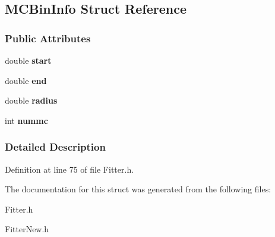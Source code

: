 \hypertarget{structMCBinInfo}{
\subsection{MCBinInfo Struct Reference}
\label{structMCBinInfo}
}
\subsubsection*{Public Attributes}
\begin{DoxyCompactItemize}
\item 
\hypertarget{structMCBinInfo_a977c6f52ec69f4842527706115ce91bf}{
double {\bfseries start}}
\label{structMCBinInfo_a977c6f52ec69f4842527706115ce91bf}

\item 
\hypertarget{structMCBinInfo_a964eaa282a44156c957e26eea27c8374}{
double {\bfseries end}}
\label{structMCBinInfo_a964eaa282a44156c957e26eea27c8374}

\item 
\hypertarget{structMCBinInfo_aaea60de9155baf52311a4664d5bd530b}{
double {\bfseries radius}}
\label{structMCBinInfo_aaea60de9155baf52311a4664d5bd530b}

\item 
\hypertarget{structMCBinInfo_a541d4c5a4903e5246343e07ac4bcb04c}{
int {\bfseries nummc}}
\label{structMCBinInfo_a541d4c5a4903e5246343e07ac4bcb04c}

\end{DoxyCompactItemize}


\subsubsection{Detailed Description}


Definition at line 75 of file Fitter.h.



The documentation for this struct was generated from the following files:\begin{DoxyCompactItemize}
\item 
Fitter.h\item 
FitterNew.h\end{DoxyCompactItemize}
